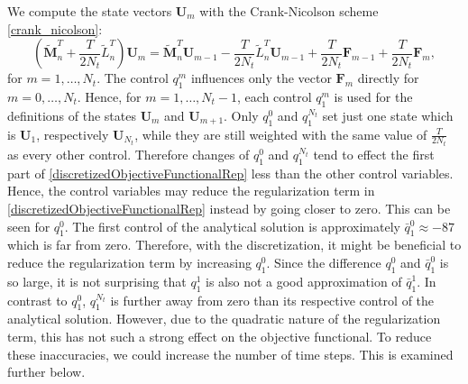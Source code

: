 We compute the state vectors $\mathbf{U}_m$ with the Crank-Nicolson scheme \eqref{crank_nicolson}:
\begin{equation*}
\left(\tilde{\mathbf{M}}_n^T + \frac{T}{2N_t} \tilde{L}_n^T\right) \mathbf{U}_m = \tilde{\mathbf{M}}_n^T\mathbf{U}_{m-1} - \frac{T}{2N_t} \tilde{L}_n^T \mathbf{U}_{m-1} + \frac{T}{2N_t} \mathbf{F}_{m-1} + \frac{T}{2N_t} \mathbf{F}_m,
\end{equation*}
for $m=1,\dotsc,N_t$. The control $q^m_1$ influences only the vector $\mathbf{F}_m$ directly for $m=0,\dotsc,N_t$. Hence, for $m=1,\dotsc,N_t-1$, each control $q^m_1$ is used for the definitions of the states $\mathbf{U}_m$ and $\mathbf{U}_{m+1}$. Only $q^0_1$ and $q^{N_t}_1$ set just one state which is $\mathbf{U}_1$, respectively $\mathbf{U}_{N_t}$, while they are still weighted with the same value of $\frac{T}{2N_t}$ as every other control. Therefore changes of $q^0_1$ and $q^{N_t}_1$ tend to effect the first part of \eqref{discretizedObjectiveFunctionalRep} less than the other control variables. Hence, the control variables may reduce the regularization term in \eqref{discretizedObjectiveFunctionalRep} instead by going closer to zero. This can be seen for $q^0_1$. The first control of the analytical solution is approximately $\bar{q}^0_1\approx-87$ which is far from zero. Therefore, with the discretization, it might be beneficial to reduce the regularization term by increasing $q^0_1$. Since the difference $q^0_1$ and $\bar{q}^0_1$ is so large, it is not surprising that $q^1_1$ is also not a good approximation of $\bar{q}^1_1$. In contrast to $q^0_1$, $q^{N_t}_1$ is further away from zero than its respective control of the analytical solution. However, due to the quadratic nature of the regularization term, this has not such a strong effect on the objective functional. To reduce these inaccuracies, we could increase the number of time steps. This is examined further below.\\

